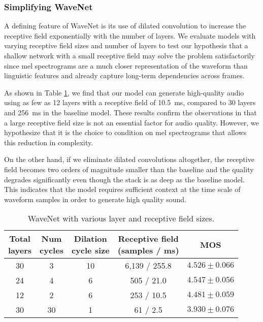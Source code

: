 \subsubsection{Simplifying WaveNet}
\label{ssec:simplifywavenet}

A defining feature of WaveNet is its use of dilated convolution to increase
the receptive field exponentially with the number of layers.
We evaluate models with varying receptive field sizes and number of
layers to test our hypothesis that a shallow network with a small receptive
field may solve the problem satisfactorily since mel spectrograms are a much
closer representation of the waveform than linguistic features and already
capture long-term dependencies across frames.

As shown in Table \ref{tbl:wavenets}, we find that our model can generate
high-quality audio using as few as 12 layers with a receptive field of
10.5~ms, compared to 30 layers and 256~ms in the baseline model. These
results confirm the observations in \cite{DBLP:journals/corr/ArikCCDGKLMRSS17}
that a large receptive field size is not an essential factor for audio
quality. However, we hypothesize that it is the choice to condition on mel
spectrograms that allows this reduction in complexity.

On the other hand, if we eliminate dilated convolutions altogether, the
receptive field becomes two orders of magnitude smaller than the baseline and
the quality degrades significantly even though the stack is as deep as the
baseline model.
This indicates that the model requires sufficient context at the time scale of
waveform samples in order to generate high quality sound.

\begin{table}[H]
  \centering
  \begin{tabular}{ccccc}
  \toprule
  \makecell{Total\\layers} & \makecell{Num\\cycles} &
  \makecell{Dilation\\cycle size} & \makecell{Receptive field\\(samples / ms)} &
  MOS \\
  \midrule
  30 & 3  & 10 & 6,139 / 255.8 & $4.526 \pm 0.066$   \\
24 & 4 &  6 & 505 / 21.0 & $4.547 \pm 0.056$   \\
12 & 2 &  6 & 253 / 10.5 & $4.481 \pm 0.059$   \\
  30 & 30 &  1 & 61 / 2.5 & $3.930 \pm 0.076$ \\
  \bottomrule
  \end{tabular}
\caption{WaveNet with various layer and receptive field sizes.}
\label{tbl:wavenets}
\end{table}
